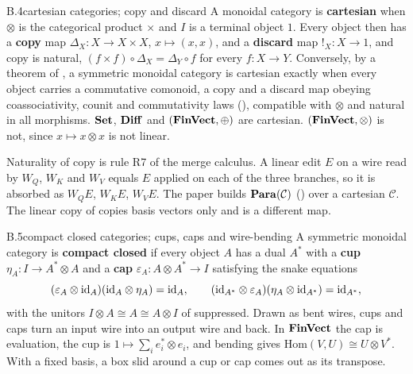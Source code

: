 
\begin{bgentry}{B.4}{cartesian categories; copy and discard}
A monoidal category is \textbf{cartesian} when $\otimes$ is the categorical product $\times$ and $I$ is a terminal object
$1$. Every object then has a \textbf{copy} map $\Delta_X:X\to X\times X$, $x\mapsto(x,x)$, and a \textbf{discard} map
${!}_X:X\to1$, and copy is natural, $(f\times f)\circ\Delta_X=\Delta_Y\circ f$ for every $f:X\to Y$. Conversely, by a
theorem of \citet{xfox1976coalgebras}, a symmetric monoidal category is cartesian exactly when every object carries a
commutative comonoid, a copy and a discard map obeying coassociativity, counit and commutativity laws (),
compatible with $\otimes$ and natural in all morphisms. $\mathbf{Set}$, $\mathbf{Diff}$ and $(\mathbf{FinVect},\oplus)$ are cartesian.
$(\mathbf{FinVect},\otimes)$ is not, since $x\mapsto x\otimes x$ is not linear.
\end{bgentry}

Naturality of copy is rule R7 of the merge calculus. A linear edit $E$ on a wire read by $W_Q$, $W_K$ and $W_V$ equals
$E$ applied on each of the three branches, so it is absorbed as $W_QE$, $W_KE$, $W_VE$. The paper builds $\mathbf{Para}(\mathcal C)$
() over a cartesian $\mathcal C$. The linear copy of  copies basis vectors only and is a different
map.


\begin{bgentry}{B.5}{compact closed categories; cups, caps and wire-bending}
A symmetric monoidal category is \textbf{compact closed} if every object $A$ has a dual $A^*$ with a \textbf{cup}
$\eta_A:I\to A^*\otimes A$ and a \textbf{cap} $\varepsilon_A:A\otimes A^*\to I$ satisfying the snake equations
\begin{equation*}
  (\varepsilon_A\otimes\mathrm{id}_A)(\mathrm{id}_A\otimes\eta_A)=\mathrm{id}_A,\qquad(\mathrm{id}_{A^*}\otimes\varepsilon_A)(\eta_A\otimes\mathrm{id}_{A^*})=\mathrm{id}_{A^*},
\end{equation*}
with the unitors $I\otimes A\cong A\cong A\otimes I$ of  suppressed. Drawn as bent wires, cups and caps turn
an input wire into an output wire and back. In $\mathbf{FinVect}$ the cap is evaluation, the cup is
$1\mapsto\sum_ie_i^*\otimes e_i$, and bending gives $\mathrm{Hom}(V,U)\cong U\otimes V^*$. With a fixed basis, a box
slid around a cup or cap comes out as its transpose.
\end{bgentry}

